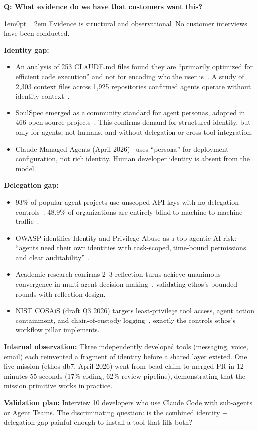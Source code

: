\documentclass[11pt,letterpaper]{article}
\newcounter{faqnum}
\newenvironment{faqpair}[1]{%
  \needspace{4\baselineskip}%
  \vspace{0.5em}%
  \refstepcounter{faqnum}%
  \noindent\textbf{\color{SectionBlue}Q\thefaqnum: #1}\par\nopagebreak[4]%
  \vspace{0.2em}%
  \begin{adjustwidth}{1em}{0pt}%
  \setlength{\parindent}{0pt}%
  \emergencystretch=2em%
}{%
  \end{adjustwidth}%
  \vspace{0.5em}%
}
\begin{document}
\begin{faqpair}{What evidence do we have that customers want this?}\label{faq:customer-evidence}
Evidence is structural and observational. No customer interviews have been conducted.

\textbf{Identity gap:}
\begin{itemize}[nosep]
  \item An analysis of 253 CLAUDE.md files found they are ``primarily optimized for efficient code execution'' and not for encoding who the user is~\cite{arxiv2025agenticmanifests}. A study of 2,303 context files across 1,925 repositories confirmed agents operate without identity context~\cite{arxiv2025agentreadmes}.
  \item SoulSpec emerged as a community standard for agent personas, adopted in 466 open-source projects~\cite{arxiv2510soulmd}. This confirms demand for structured identity, but only for agents, not humans, and without delegation or cross-tool integration.
  \item Claude Managed Agents (April 2026)~\cite{claudemanagedagents2026} uses ``persona'' for deployment configuration, not rich identity. Human developer identity is absent from the model.
\end{itemize}

\textbf{Delegation gap:}
\begin{itemize}[nosep]
  \item 93\% of popular agent projects use unscoped API keys with no delegation controls~\cite{grantexagentsec2026}. 48.9\% of organizations are entirely blind to machine-to-machine traffic~\cite{saltsecurity2026agentsec}.
  \item OWASP identifies Identity and Privilege Abuse as a top agentic AI risk: ``agents need their own identities with task-scoped, time-bound permissions and clear auditability''~\cite{owaspagentic2025}.
  \item Academic research confirms 2--3 reflection turns achieve unanimous convergence in multi-agent decision-making~\cite{arxiv2504consensus2026}, validating ethos's bounded-rounds-with-reflection design.
  \item NIST COSAiS (draft Q3 2026) targets least-privilege tool access, agent action containment, and chain-of-custody logging~\cite{nistcosais2026}, exactly the controls ethos's workflow pillar implements.
\end{itemize}

\textbf{Internal observation:} Three independently developed tools (messaging, voice, email) each reinvented a fragment of identity before a shared layer existed. One live mission (ethos-db7, April 2026) went from bead claim to merged PR in 12 minutes 55 seconds (17\% coding, 62\% review pipeline), demonstrating that the mission primitive works in practice.

\textbf{Validation plan:} Interview 10 developers who use Claude Code with sub-agents or Agent Teams. The discriminating question: is the combined identity + delegation gap painful enough to install a tool that fills both?
\end{faqpair}
\end{document}
